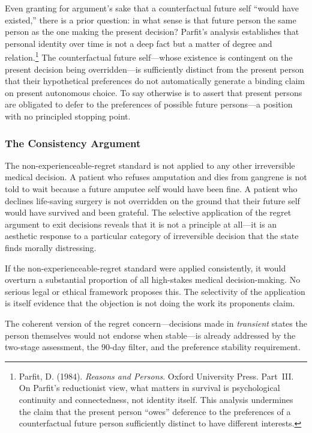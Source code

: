 \documentclass[11pt, letterpaper]{article}
\begin{document}
Even granting for argument's sake that a counterfactual future self ``would have
existed,'' there is a prior question: in what sense is that future person the same
person as the one making the present decision? Parfit's analysis establishes that
personal identity over time is not a deep fact but a matter of degree and relation.\footnote{%
  Parfit, D. (1984). \textit{Reasons and Persons}. Oxford University Press. Part~III.
  On Parfit's reductionist view, what matters in survival is psychological continuity
  and connectedness, not identity itself. This analysis undermines the claim that the
  present person ``owes'' deference to the preferences of a counterfactual future person
  sufficiently distinct to have different interests.}
The counterfactual future self---whose existence is contingent on the present decision
being overridden---is sufficiently distinct from the present person that their
hypothetical preferences do not automatically generate a binding claim on present
autonomous choice. To say otherwise is to assert that present persons are obligated to
defer to the preferences of possible future persons---a position with no principled
stopping point.

\subsubsection{The Consistency Argument}

The non-experienceable-regret standard is not applied to any other irreversible medical
decision. A patient who refuses amputation and dies from gangrene is not told to wait
because a future amputee self would have been fine. A patient who declines life-saving
surgery is not overridden on the ground that their future self would have survived and
been grateful. The selective application of the regret argument to exit decisions reveals
that it is not a principle at all---it is an aesthetic response to a particular category
of irreversible decision that the state finds morally distressing.

If the non-experienceable-regret standard were applied consistently, it would overturn
a substantial proportion of all high-stakes medical decision-making. No serious legal
or ethical framework proposes this. The selectivity of the application is itself evidence
that the objection is not doing the work its proponents claim.

The coherent version of the regret concern---decisions made in \textit{transient} states
the person themselves would not endorse when stable---is already addressed by the
two-stage assessment, the 90-day filter, and the preference stability requirement.
\end{document}
